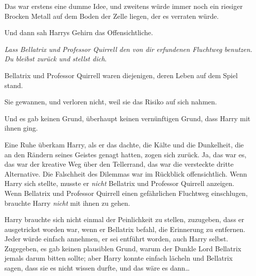Das war erstens eine dumme Idee, und zweitens würde immer noch ein riesiger Brocken Metall auf dem Boden der Zelle liegen, der es verraten würde.

Und dann sah Harrys Gehirn das Offensichtliche.

\emph{Lass Bellatrix und Professor Quirrell den von dir erfundenen Fluchtweg benutzen. Du bleibst zurück und stellst dich}.

Bellatrix und Professor Quirrell waren diejenigen, deren Leben auf dem Spiel stand.

Sie gewannen, und verloren nicht, weil sie das Risiko auf sich nahmen.

Und es gab keinen Grund, überhaupt keinen vernünftigen Grund, dass Harry mit ihnen ging.

Eine Ruhe überkam Harry, als er das dachte, die Kälte und die Dunkelheit, die an den Rändern seines Geistes genagt hatten, zogen sich zurück. Ja, das war es, das war der kreative Weg über den Tellerrand, das war die versteckte dritte Alternative. Die Falschheit des Dilemmas war im Rückblick offensichtlich. Wenn Harry sich stellte, musste er \emph{nicht} Bellatrix und Professor Quirrell anzeigen. Wenn Bellatrix und Professor Quirrell einen gefährlichen Fluchtweg einschlugen, brauchte Harry \emph{nicht} mit ihnen zu gehen.

Harry brauchte sich nicht einmal der Peinlichkeit zu stellen, zuzugeben, dass er ausgetrickst worden war, wenn er Bellatrix befahl, die Erinnerung zu entfernen. Jeder würde einfach annehmen, er sei entführt worden, auch Harry selbst. Zugegeben, es gab keinen plausiblen Grund, warum der Dunkle Lord Bellatrix jemals darum bitten sollte; aber Harry konnte einfach lächeln und Bellatrix sagen, dass sie es nicht wissen durfte, und das wäre es dann…

